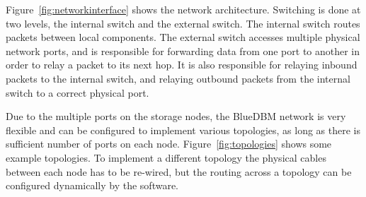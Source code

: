 Figure~\ref{fig:networkinterface} shows the network architecture. Switching is
done at two levels, the internal switch and the external switch.  The internal
switch routes packets between local components.  The external switch accesses
multiple physical network ports, and is responsible for forwarding data from one
port to another in order to relay a packet to its next hop. It is also
responsible for relaying inbound packets to the internal
switch, and relaying outbound packets from the internal switch to a correct
physical port. 

Due to the multiple ports on the storage nodes, the BlueDBM network is very
flexible and can be configured to implement various topologies, as long as there
is sufficient number of ports on each node.
Figure~\ref{fig:topologies} shows some example topologies. To implement a
different topology the physical cables between each node has to be re-wired, but
the routing across a topology can be configured dynamically by the software.


